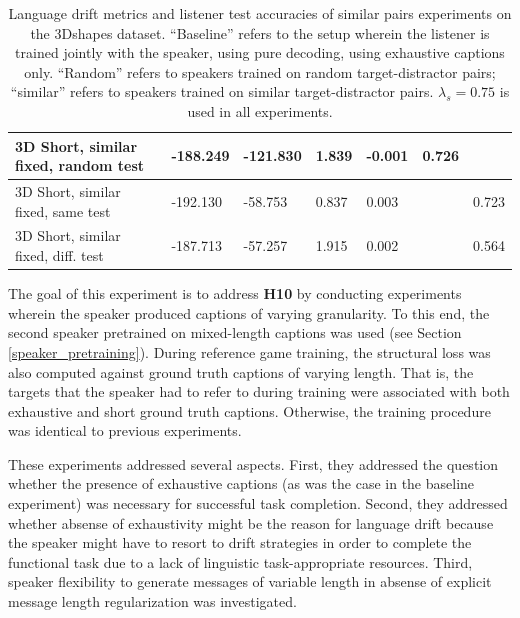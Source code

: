 \begin{table}[]
\begin{tabularx}{\textwidth}{|X|l|l|X|X|X|X|}
		3D Short, similar fixed, random test&      -188.249           &     -121.830                  &             1.839         &         -0.001             &                   0.726                       &                                        \\ \hline
		3D Short, similar fixed, same test&      -192.130      &     -58.753      &   0.837      & 0.003      &                       &               0.723                           \\ \hline
		3D Short, similar fixed, diff. test &  -187.713       & -57.257     & 1.915        &  0.002         &      &     0.564       \\ \hline
	\end{tabularx}
	\caption{\label{tab:3dshapes_drift_metrics_basic_short} Language drift metrics and listener test accuracies of similar pairs experiments on the 3Dshapes dataset. 
		``Baseline'' refers to the setup wherein the listener is trained jointly with the speaker, using pure decoding, using exhaustive captions only. ``Random'' refers to speakers trained on random target-distractor pairs; ``similar'' refers to speakers trained on similar target-distractor pairs. $\lambda_s = 0.75$ is used in all experiments.}
\end{table}

The goal of this experiment is to address \textbf{H10} by conducting experiments wherein the speaker produced captions of varying granularity.
To this end, the second speaker pretrained on mixed-length captions was used (see Section \ref{speaker_pretraining}). During reference game training, the structural loss was also computed against ground truth captions of varying length. That is, the targets that the speaker had to refer to during training were associated with both exhaustive and short ground truth captions. Otherwise, the training procedure was identical to previous experiments.

These experiments addressed several aspects. First, they addressed the question whether the presence of exhaustive captions (as was the case in the baseline experiment) was necessary for successful task completion. Second, they addressed whether absense of exhaustivity might be the reason for language drift because the speaker might have to resort to drift strategies in order to complete the functional task due to a lack of linguistic task-appropriate resources. 
Third, speaker flexibility to generate messages of variable length in absense of explicit message length regularization was investigated. 

